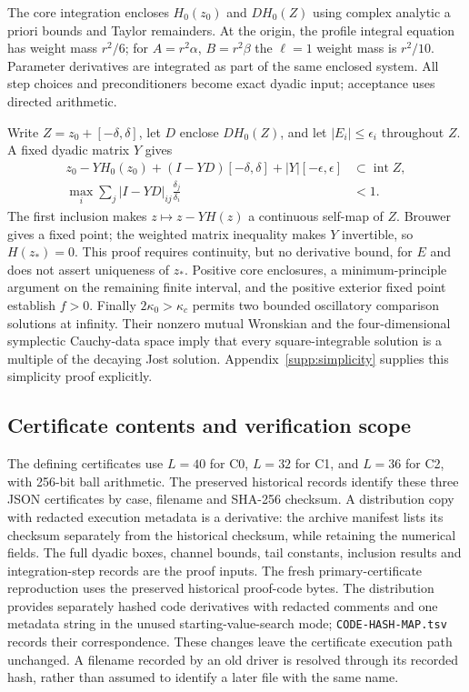 The core integration encloses $H_0(z_0)$ and $DH_0(Z)$ using complex
analytic a priori bounds and Taylor remainders. At the origin, the
profile integral equation has weight mass $r^2/6$; for
$A=r^2\alpha$, $B=r^2\beta$ the $\ell=1$ weight mass is $r^2/10$.
Parameter derivatives are integrated as part of the same enclosed
system. All step choices and preconditioners become exact dyadic input;
acceptance uses directed arithmetic.

Write $Z=z_0+[-\delta,\delta]$, let $D$ enclose $DH_0(Z)$, and let
$|E_i|\leq\epsilon_i$ throughout $Z$. A fixed dyadic matrix $Y$ gives
\begin{equation}
 \begin{split}
 z_0-YH_0(z_0)+(I-YD)[-\delta,\delta]
       +|Y|[-\epsilon,\epsilon]&\subset\operatorname{int}Z,\\
 \max_i\sum_j |I-YD|_{ij}\frac{\delta_j}{\delta_i}&<1.
 \end{split}
 \label{eq:proof-krawczyk-inclusion}
\end{equation}
The first inclusion makes $z\mapsto z-YH(z)$ a continuous self-map of
$Z$. Brouwer gives a fixed point; the weighted matrix inequality makes
$Y$ invertible, so $H(z_*)=0$. This proof requires continuity, but no
derivative bound, for $E$ and does not assert uniqueness of $z_*$.
Positive core enclosures, a minimum-principle argument on the remaining
finite interval, and the positive exterior fixed point establish $f>0$.
Finally $2\kappa_0>\kappa_c$ permits two bounded oscillatory comparison
solutions at infinity. Their nonzero mutual Wronskian and the
four-dimensional symplectic Cauchy-data space imply that every
square-integrable solution is a multiple of the decaying Jost solution.
Appendix~\ref{supp:simplicity} supplies this simplicity proof explicitly.

\subsection{Certificate contents and verification scope}
\label{sec:proof-verification-limits}
The defining certificates use $L=40$ for C0, $L=32$ for C1, and $L=36$
for C2, with 256-bit ball arithmetic. The preserved historical records
identify these three JSON certificates by case, filename and SHA-256
checksum. A distribution copy with redacted execution metadata is a
derivative: the archive manifest lists its checksum separately from the
historical checksum, while retaining the numerical fields. The full
dyadic boxes, channel bounds, tail constants,
inclusion results and integration-step records are the proof inputs.
The fresh primary-certificate reproduction uses the preserved historical
proof-code bytes. The distribution provides separately hashed code
derivatives with redacted comments and one metadata string in the unused
starting-value-search mode; \texttt{CODE-HASH-MAP.tsv} records their
correspondence. These changes leave the certificate execution path unchanged.
A filename recorded by an old driver is resolved through its recorded
hash, rather than assumed to identify a later file with the same name.

